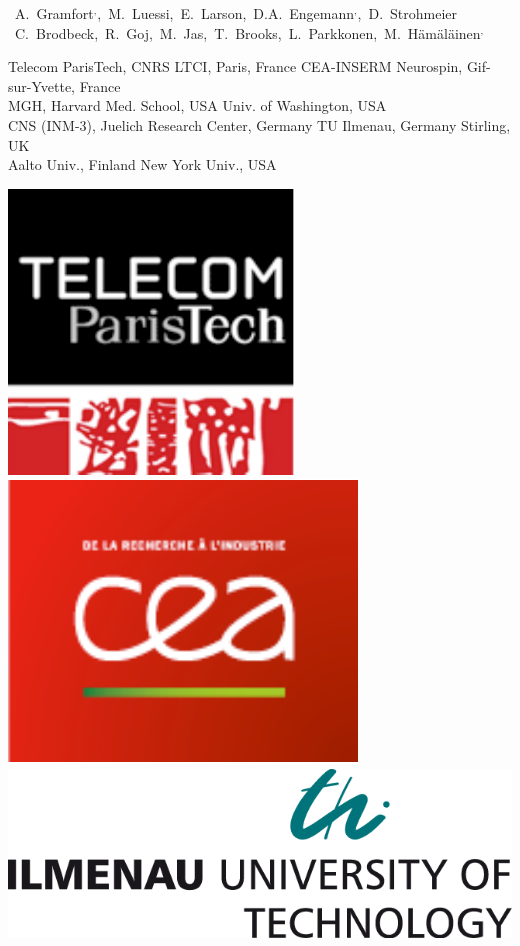 \documentclass[t,11pt,compress]{beamer} %
\def\name#1{\mbox{\sc #1}}
\begin{document}
\begin{frame}[plain,t,c]
{    \begin{center}
    \mbox{\hspace{-1em}%
    \name{A. Gramfort\PARISTECH$^{,}$\NSPIN, M. Luessi\MGH, E. Larson\UW, D.A.        
	      Engemann\NSPIN$^{,}$\JUELICH, D. Strohmeier\ILMENAU}}
    \mbox{\hspace{-1em}%
    \name{C. Brodbeck\NYU, R. Goj\STIRLING, M. Jas\AALTO, T. Brooks\NYU, L. Parkkonen\AALTO, M. H\"am\"al\"ainen\MGH$^,$\AALTO}}
	\vspace{0.05cm}
	\def\affilbr{\hspace{0.2cm}}
    \parbox{13cm}{\tiny\center
                 \PARISTECH Telecom ParisTech, CNRS LTCI, Paris, France \affilbr
                 \NSPIN CEA-INSERM Neurospin, Gif-sur-Yvette, France \affilbr\\
                 \MGH MGH, Harvard Med. School, USA \affilbr
                 \UW Univ. of Washington, USA\\
                 \JUELICH CNS (INM-3), Juelich Research Center, Germany \affilbr
                 \ILMENAU TU Ilmenau, Germany \affilbr
                 \STIRLING Stirling, UK \affilbr\\
                 \AALTO Aalto Univ., Finland \affilbr
                 \NYU New York Univ., USA}
    \end{center}
}
%
\hfill
%
\begin{minipage}{0.15\linewidth}
    \vspace{0ex}
    \hfill
    \centerline{%
    \includegraphics[width=0.188\linewidth]{logo_telecom}
    \,
    \includegraphics[width=0.233\linewidth]{logo_cea}
    \,
    \includegraphics[width=0.45\linewidth]{logo_tuil}
}
\end{minipage}
\end{frame}
\end{document}
